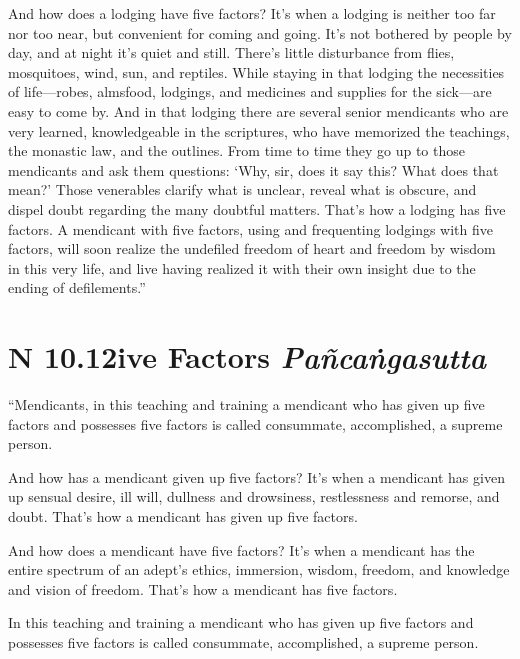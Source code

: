 \documentclass[12pt,openany]{book}%
\newcommand*{\suttatitleacronym}[1]{\smaller[2]{#1}\vspace*{.3em}}
\newcommand*{\suttatitletranslation}[1]{\linebreak{#1}}
\newcommand*{\suttatitleroot}[1]{\linebreak\smaller[2]\itshape{#1}}
\newcommand*{\tocacronym}[1]{\hspace*{-3.3em}{#1}\quad}
\newcommand*{\toctranslation}[1]{#1}
\newcommand*{\tocroot}[1]{(\textit{#1})}
\begin{document}
And how does a lodging have five factors? It’s when a lodging is neither too far nor too near, but convenient for coming and going. It’s not bothered by people by day, and at night it’s quiet and still. There’s little disturbance from flies, mosquitoes, wind, sun, and reptiles. While staying in that lodging the necessities of life—robes, almsfood, lodgings, and medicines and supplies for the sick—are easy to come by. And in that lodging there are several senior mendicants who are very learned, knowledgeable in the scriptures, who have memorized the teachings, the monastic law, and the outlines. From time to time they go up to those mendicants and ask them questions: ‘Why, sir, does it say this? What does that mean?’ Those venerables clarify what is unclear, reveal what is obscure, and dispel doubt regarding the many doubtful matters. That’s how a lodging has five factors. A mendicant with five factors, using and frequenting lodgings with five factors, will soon realize the undefiled freedom of heart and freedom by wisdom in this very life, and live having realized it with their own insight due to the ending of defilements.” 

%
\section*{{\suttatitleacronym AN 10.12}{\suttatitletranslation Five Factors }{\suttatitleroot Pañcaṅgasutta}}
\addcontentsline{toc}{section}{\tocacronym{AN 10.12} \toctranslation{Five Factors } \tocroot{Pañcaṅgasutta}}

“Mendicants, in this teaching and training a mendicant who has given up five factors and possesses five factors is called consummate, accomplished, a supreme person. 

And how has a mendicant given up five factors? It’s when a mendicant has given up sensual desire, ill will, dullness and drowsiness, restlessness and remorse, and doubt. That’s how a mendicant has given up five factors. 

And how does a mendicant have five factors? It’s when a mendicant has the entire spectrum of an adept’s ethics, immersion, wisdom, freedom, and knowledge and vision of freedom. That’s how a mendicant has five factors. 

In this teaching and training a mendicant who has given up five factors and possesses five factors is called consummate, accomplished, a supreme person. 
\end{document}
